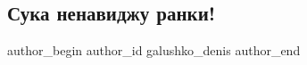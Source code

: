  
 
 
 
 

\subsection{Сука ненавиджу ранки!}
\label{sec:29_09_2022.fb.galushko_denis.1.suka_nenavidzhu_rank}

\ifcmt
 author_begin
   author_id galushko_denis
 author_end
\fi
